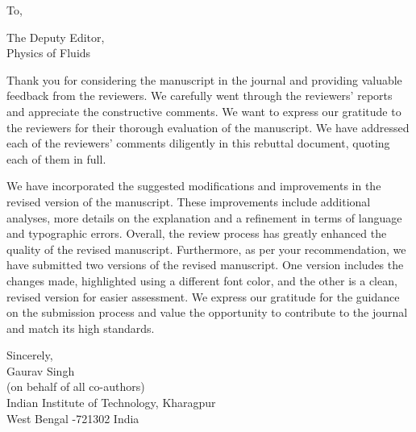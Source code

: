 \documentclass[onecolumn,a4paper,amsmath,amssym,pre]{revtex4}
\begin{document}
				To,
				
				The Deputy Editor,\\ 
				Physics of Fluids\\
				\par\null\par
				
				Thank you for considering the manuscript in the journal and providing valuable feedback from the reviewers. We carefully went through the reviewers' reports and appreciate the constructive comments. We want to express our gratitude to the reviewers for their thorough evaluation of the manuscript. We have addressed each of the reviewers' comments diligently in this rebuttal document, quoting each of them in full.
				\par\null\par
				We have incorporated the suggested modifications and improvements in the revised version of the manuscript. These improvements include additional analyses, more details on the explanation and a refinement in terms of  language and typographic errors. Overall, the review process has greatly enhanced the quality of the revised manuscript.	Furthermore, as per your recommendation, we have submitted two versions of the revised manuscript. One version includes the changes made, highlighted using a different font color, and the other is a clean, revised version for easier assessment.
				We express our gratitude for the guidance on the submission process and value the opportunity to contribute to the journal and match its high standards.\\
				\par\null\par
				\par\null\par
				Sincerely,\\
				
				Gaurav Singh\\
				(on behalf of all co-authors)\\
				Indian Institute of Technology, Kharagpur\\
				West Bengal -721302
				India
				
\end{document}
